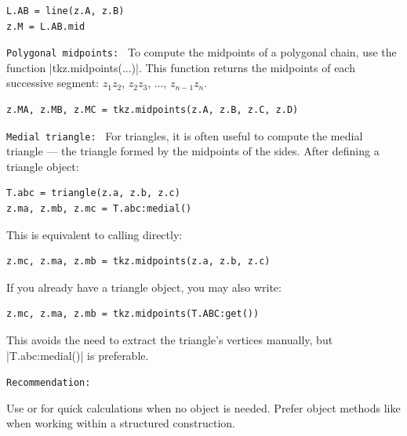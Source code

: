 \begin{mybox}
\begin{verbatim}
L.AB = line(z.A, z.B)
z.M = L.AB.mid
\end{verbatim}
\end{mybox}

\medskip
\texttt{Polygonal midpoints: }
To compute the midpoints of a polygonal chain, use the function |tkz.midpoints(...)|. This function returns the midpoints of each successive segment: $z_1z_2$, $z_2z_3$, ..., $z_{n-1}z_n$.

\begin{mybox}
\begin{verbatim}
z.MA, z.MB, z.MC = tkz.midpoints(z.A, z.B, z.C, z.D)
\end{verbatim}
\end{mybox}

\medskip
\texttt{Medial triangle: }
For triangles, it is often useful to compute the medial triangle — the triangle formed by the midpoints of the sides. After defining a triangle object:

\begin{mybox}
\begin{verbatim}
T.abc = triangle(z.a, z.b, z.c)
z.ma, z.mb, z.mc = T.abc:medial()
\end{verbatim}
\end{mybox}

This is equivalent to calling  directly:

\begin{mybox}
\begin{verbatim}
z.mc, z.ma, z.mb = tkz.midpoints(z.a, z.b, z.c)
\end{verbatim}
\end{mybox}

If you already have a triangle object, you may also write:

\begin{mybox}
\begin{verbatim}
z.mc, z.ma, z.mb = tkz.midpoints(T.ABC:get())
\end{verbatim}
\end{mybox}

This avoids the need to extract the triangle’s vertices manually, but |T.abc:medial()| is preferable.

\medskip
\texttt{Recommendation: }

Use  or  for quick calculations when no object is needed. Prefer object methods like  when working within a structured construction.

